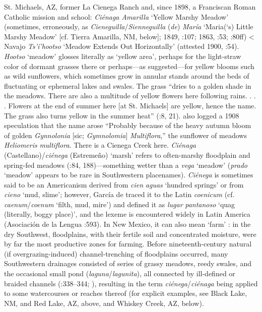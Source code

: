 St. Michaels, AZ, former La Cienega Ranch and, since 1898, a Franciscan Roman Catholic mission and school:  \textit{Ciénaga} \textit{Amarilla} ‘Yellow Marshy Meadow’ (sometimes, erroneously, as \textit{Cieneguilla}/\textit{Sienneguilla} (\textit{de}) \textit{María} ‘Maria(‘s) Little Marshy Meadow’ [cf. Tierra Amarilla, NM, below]; 1849, \citealt{McNitt1964}:107; 1863, \citealt{Kelly1970}:53; \citealt{Trafzer1982}:80ff) < Navajo \textit{Ts'í'hootso} ‘Meadow Extends Out Horizontally’ (attested 1900, \citealt{Ostermann2004a}:54).  \textit{Hootso} ‘meadow’ glosses literally as ‘yellow area’, perhaps for the light-straw color of dormant grasses there or perhaps—as \citet[107]{McNitt1964} suggested—for yellow blooms such as wild sunflowers, which sometimes grow in annular stands around the beds of fluctuating or ephemeral lakes and swales.  The grass “dries to a golden shade in the meadows.  There are also a multitude of yellow flowers here following rains. . . .  Flowers at the end of summer here [at St. Michaels] are yellow, hence the name.  The grass also turns yellow in the summer heat” (\citealt{BarnesGranger1960}:8, 21).  \citet[24]{Wilken1955} also logged a 1908 speculation that the name arose “Probably because of the heavy autumn bloom of golden \textit{Gynnolonia} [sic; \textit{Gymnolomia}] \textit{Multiflora},” the sunflower of meadows \textit{Heliomeris} \textit{multiflora}.  There is a Cienega Creek here.  \textit{Ciénaga} (Castellano)/\textit{ciénega} (Estremeño) ‘marsh’ refers to often-marshy floodplain and spring-fed meadows (\citealt{Julyan1998}:84, 188)—something wetter than a \textit{vega} ‘meadow’ (\textit{prado} ‘meadow’ appears to be rare in Southwestern placenames).  \textit{Ciénega} is sometimes said to be an Americanism derived from \textit{cien} \textit{aguas} ‘hundred springs’ or from \textit{cieno} ‘mud, slime’; however, García de \citet[164]{Diego1955} traced it to the Latin \textit{coenicum} (cf. \textit{caenum}/\textit{coenum} ‘filth, mud, mire’) and defined it as \textit{lugar} \textit{pantanoso} ‘quag (literally, boggy place)’, and the lexeme is encountered widely in Latin America (Asociación de la Lengua \citealt{Española2010}:593).  In New Mexico, it can also mean ‘farm’ \citep[31]{Cobos1983}: in the dry Southwest, floodplains, with their fertile soil and concentrated moisture, were by far the most productive zones for farming.  Before nineteenth-century natural (if overgrazing-induced) channel-trenching of floodplains occurred, many Southwestern drainages consisted of series of grassy meadows, reedy swales, and the occasional small pond (\textit{laguna}/\textit{lagunita}), all connected by ill-defined or braided channels (\citealt{Bryan1925}:338–344; \citealt{Leopold1951}), resulting in the term \textit{ciénega}/\textit{ciénaga} being applied to some watercourses or reaches thereof (for explicit examples, see Black Lake, NM, and Red Lake, AZ, above, and Whiskey Creek, AZ, below).

